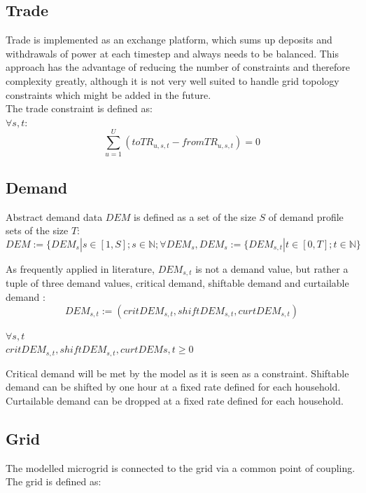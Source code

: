 \documentclass[
	11pt,								%
	DIV10,								%
	a4paper,         					%
	oneside,							%
	headheight=20pt,					%
	footheight=20pt,					%
    parskip=full,						%
    listof=totoc,						%
	bibliography=totoc,					%
	index=totoc,						%
]{scrartcl}
\begin{document}
\subsection{Trade}
Trade is implemented as an exchange platform, which sums up deposits and withdrawals of power at each timestep and always needs to be balanced. This approach has the advantage of reducing the number of constraints and therefore complexity greatly, although it is not very well suited to handle grid topology constraints which might be added in the future.\\
The trade constraint is defined as:
\\

$\forall s,t$:
\begin{equation}
	\sum_{u = 1}^{U}(toTR_{u,s,t}-fromTR_{u,s,t}) = 0
\end{equation}





\subsection{Demand}
Abstract demand data $DEM$ is defined as a set of the size $S$ of demand profile sets of the size $T$:
\begin{equation}
 DEM:= \{DEM_s | s \in [1,S]; s\in \mathbb{N}; \forall DEM_s, DEM_s := \{DEM_{s,t} | t\in [0,T]; t \in \mathbb{N}\}
\end{equation}

As frequently applied in literature, $DEM_{s,t}$ is not a demand value, but rather a tuple of three demand values, critical demand, shiftable demand and curtailable demand \cite{silvente2015rolling}\cite{zhang2015optimal}\cite{8216436}\cite{7972908} : 
\begin{equation}
 DEM_{s,t}:= (critDEM_{s,t}, shiftDEM_{s,t}, curtDEM_{s,t}) 
\end{equation}

$\forall s,t$\\
$critDEM_{s,t}, shiftDEM_{s,t}, curtDEM{s,t} \geq 0$

Critical demand will be met by the model as it is seen as a constraint. Shiftable demand can be shifted by one hour at a fixed rate defined for each household. Curtailable demand can be dropped at a fixed rate defined for each household.





\subsection{Grid}
The modelled microgrid is connected to the grid via a common point of coupling. The grid is defined as:
\end{document}
